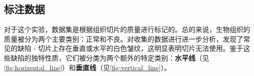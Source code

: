



\subsection{标注数据}

对于这个实验，数据集是根据组织切片的质量进行标记的。总的来说，生物组织的质量被分为两个主要类别：正常和不良。对收集的数据进行进一步分析，发现了常见的缺陷 - 切片上存在垂直或水平的白色皱纹，这明显表明切片无法使用。鉴于这些缺陷的独特性质，它们被分类为两个额外的特定类别：\textbf{水平线}（见\autoref{fig:horizental_line}）和\textbf{垂直线}（见\autoref{fig:vertical_line}）。

